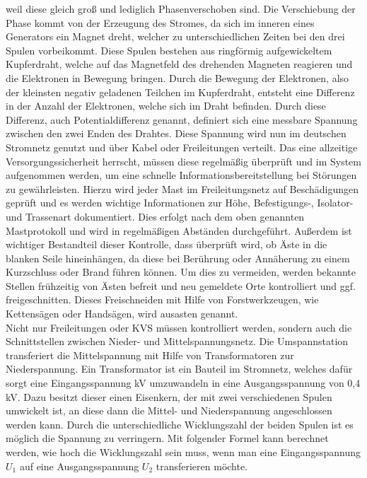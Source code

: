 weil diese gleich groß und lediglich Phasenverschoben sind. Die Verschiebung der Phase kommt von der Erzeugung des Stromes, da sich im inneren eines Generators 
ein Magnet dreht, welcher zu unterschiedlichen Zeiten bei den drei Spulen vorbeikommt. Diese Spulen bestehen aus ringförmig aufgewickeltem Kupferdraht, welche 
auf das Magnetfeld des drehenden Magneten reagieren und die Elektronen in Bewegung bringen. Durch die Bewegung der Elektronen, also der kleinsten negativ 
geladenen Teilchen im Kupferdraht, entsteht eine Differenz in der Anzahl der Elektronen, welche sich im Draht befinden. Durch diese Differenz, auch 
Potentialdifferenz genannt, definiert sich eine messbare Spannung zwischen den zwei Enden des Drahtes. Diese Spannung wird nun im deutschen Stromnetz genutzt 
und über Kabel oder Freileitungen verteilt. Das eine allzeitige Versorgungssicherheit herrscht, müssen diese regelmäßig überprüft und im System aufgenommen 
werden, um eine schnelle Informationsbereitstellung bei Störungen zu gewährleisten. Hierzu wird jeder Mast im Freileitungsnetz auf Beschädigungen geprüft und 
es werden wichtige Informationen zur Höhe, Befestigungs-, Isolator- und Trassenart dokumentiert. Dies erfolgt nach dem oben genannten Mastprotokoll und wird 
in regelmäßigen Abständen durchgeführt. Außerdem ist wichtiger Bestandteil dieser Kontrolle, dass überprüft wird, ob Äste in die blanken Seile hineinhängen, 
da diese bei Berührung oder Annäherung zu einem Kurzschluss oder Brand führen können. Um dies zu vermeiden, werden bekannte Stellen frühzeitig von Ästen 
befreit und neu gemeldete Orte kontrolliert und ggf. freigeschnitten. Dieses Freischneiden mit Hilfe von Forstwerkzeugen, wie Kettensägen oder Handsägen, 
wird ausasten genannt.
\\
Nicht nur Freileitungen oder KVS müssen kontrolliert werden, sondern auch die Schnittstellen zwischen Nieder- und Mittelspannungsnetz. Die Umspannstation 
transferiert die Mittelspannung mit Hilfe von Transformatoren zur Niederspannung. Ein Transformator ist ein Bauteil im Stromnetz, welches dafür sorgt eine 
Eingangsspannung  kV umzuwandeln in eine Ausgangsspannung von 0,4 kV. Dazu besitzt dieser einen Eisenkern, der mit zwei verschiedenen Spulen 
umwickelt ist, an diese dann die Mittel- und Niederspannung angeschlossen werden kann. Durch die unterschiedliche Wicklungszahl der beiden Spulen ist 
es möglich die Spannung zu verringern. Mit folgender Formel kann berechnet werden, wie hoch die Wicklungszahl sein muss, wenn man \zB eine 
Eingangsspannung $U_1$ auf eine Ausgangsspannung $U_2$ transferieren möchte. 
